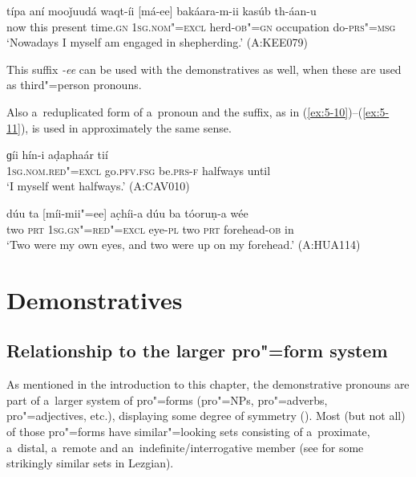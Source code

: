 \begin{exe}
\ex
\label{ex:5-9}
\gll típa aní mooǰuudá waqt-íi [má-ee] bakáara-m-ii kasúb th-áan-u \\
	now this present time.\textsc{gn} \textsc{1sg.nom"=excl} herd-\textsc{ob"=gn} occupation do-\textsc{prs"=msg} \\
\glt `Nowadays I myself am engaged in shepherding.' (A:KEE079)
\end{exe}

This suffix \textit{-ee} can be used with the demonstratives as well, when these are used as third"=person pronouns. 

Also a~reduplicated form of a~pronoun and the suffix, as in (\ref{ex:5-10})--(\ref{ex:5-11}), is used in approximately the same sense.


\begin{exe}
\ex
\label{ex:5-10}
\gll [mám-ee] ɡíi hín-i aḍaphaár tií\\
	\textsc{1sg.nom.red"=excl} go.\textsc{pfv.fsg} be.\textsc{prs-f} halfways until \\
\glt `I myself went halfways.' (A:CAV010)

\ex
\label{ex:5-11}
\gll dúu ta [míi-mii"=ee] ac̣híi-a dúu ba tóoruṇ-a wée \\
	two \textsc{prt} \textsc{1sg.gn"=red"=excl} eye-\textsc{pl} two \textsc{prt} forehead-\textsc{ob} in \\
\glt `Two were my own eyes, and two were up on my forehead.' (A:HUA114) 
\end{exe}

\section{Demonstratives}
\label{sec:5-3}

\subsection{Relationship to the larger pro"=form system}
\label{subsec:5-2-1}


As mentioned in the introduction to this chapter, the demonstrative pronouns are part of a~larger system of pro"=forms (pro"=NPs, pro"=adverbs, pro"=adjectives, etc.), displaying some degree of symmetry (). Most (but not all) of those pro"=forms have similar"=looking sets consisting of a~proximate, a~distal, a~remote and an~indefinite/interrogative member (see \citealt[187--188]{haspelmath1993} for some strikingly similar sets in Lezgian).



